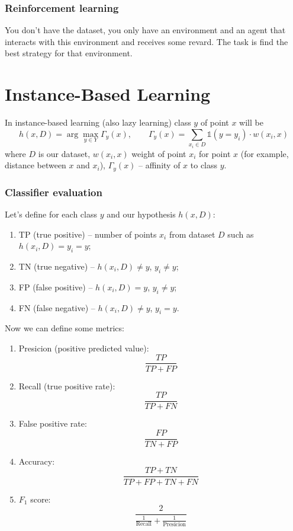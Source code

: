 \subsubsection*{Reinforcement learning}

You don't have the dataset, you only have an environment and an agent that interacts with this environment and receives some revard. The task is find the best strategy for that environment.

\section{Instance-Based Learning}

In instance-based learning (also lazy learning) class $y$ of point $x$ will be
$$h(x, D)=\arg\max\limits_{y\in Y}\Gamma_y(x), \qquad \Gamma_y(x)=\sum\limits_{x_i\in D}\mathbb{1}(y=y_i)\cdot w(x_i,x)$$
where $D$ is our dataset, $w(x_i,x)$ weight of point $x_i$ for point $x$ (for example, distance between $x$ and $x_i$), $\Gamma_y(x)$ -- affinity of $x$ to class $y$.

\subsubsection*{Classifier evaluation}

Let's define for each class $y$ and our hypothesis $h(x, D)$:
\begin{enumerate}[label=$\bullet$]
	\item TP (true positive) -- number of points $x_i$ from dataset $D$ such as $h(x_i, D)=y_i=y$;
	\item TN (true negative) -- $h(x_i, D)\ne y$, $y_i\ne y$;
	\item FP (false positive) -- $h(x_i, D)=y$, $y_i\ne y$;
	\item FN (false negative) -- $h(x_i, D)\ne y$, $y_i=y$.
\end{enumerate}
Now we can define some metrics:
\begin{enumerate}[label=$\bullet$]
	\item Presicion (positive predicted value): $$\frac{TP}{TP + FP}$$
	\item Recall (true positive rate): $$\frac{TP}{TP+FN}$$
	\item False positive rate: $$\frac{FP}{TN+FP}$$
	\item Accuracy: $$\frac{TP+TN}{TP+FP+TN+FN}$$
	\item $F_1$ score: $$\frac{2}{\frac{1}{\text{Recall}}+\frac{1}{\text{Presicion}}}$$
\end{enumerate}

